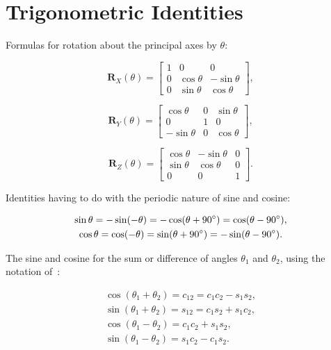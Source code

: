 
\chapter{Trigonometric Identities}

Formulas for rotation about the principal axes by $\theta$:

\begin{equation}
{\mathbf{R}}_X(\theta) =
\begin{bmatrix}
1	&	0			& 	0\\
0	&	\cos\theta		&	-\sin\theta\\
0	&	\sin\theta		&	\cos\theta
\end{bmatrix},
\end{equation}

\begin{equation}
{\mathbf{R}}_Y(\theta) =
\begin{bmatrix}
\cos\theta		&	0	&	\sin\theta\\
0			&	1	&	0\\
-\sin\theta		&	0	&	\cos\theta
\end{bmatrix},
\end{equation}

\begin{equation}
{\mathbf{R}}_Z(\theta) =
\begin{bmatrix}
\cos\theta		&	-\sin\theta		&	0\\
\sin\theta		&	\cos\theta		&	0\\
0			&	0			&	1
\end{bmatrix}.
\end{equation}

Identities having to do with the periodic nature of sine and cosine:

\begin{gather}
\sin\theta = -\sin(-\theta) = -\cos(\theta + 90^\circ) = \cos(\theta - 90^\circ),\\
\cos\theta = \cos(-\theta) = \sin(\theta + 90^\circ) = -\sin(\theta - 90^\circ).
\end{gather}

The sine and cosine for the sum or difference of angles $\theta_1$ and $\theta_2$, using the notation of~\cite{craig}:

\begin{gather}
\cos(\theta_1 + \theta_2) = c_{12} = c_1 c_2 - s_1 s_2,\\
\sin(\theta_1 + \theta_2) = s_{12} = c_1 s_2 + s_1 c_2,\\
\cos(\theta_1 - \theta_2) = c_1 c_2 + s_1 s_2,\\
\sin(\theta_1 - \theta_2) = s_1 c_2 - c_1 s_2.
\end{gather}

